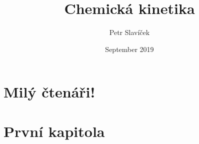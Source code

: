 \documentclass{article}
\title{Chemická kinetika}
\author{Petr Slavíček}
\date{September 2019}
\begin{document}


\pagestyle{plain}
\setcounter{page}{3}
\tableofcontents

\clearpage
\section*{Milý čtenáři!}
\label{kap:uvod}


\clearpage
\section{První kapitola}
%
\end{document}
